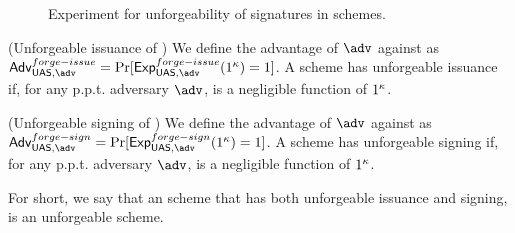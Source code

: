 \begin{figure}[htp!]
  \caption{Experiment for unforgeability of signatures in \UAS schemes.}
  \label{fig:exp-uas-unfor-sign}
\end{figure}


\begin{definition}{(Unforgeable issuance of \UAS)}
  We define the advantage \AdvForgeIssue of $\adv$ against \ExpForgeIssue as
  $\AdvForgeIssue=\Pr\lbrack\ExpForgeIssue(1^\secpar)=1\rbrack$.
  A \UAS scheme has unforgeable issuance if, for any p.p.t. adversary $\adv$,
  \AdvForgeIssue is a negligible function of $1^\kappa$.
\end{definition}

\begin{definition}{(Unforgeable signing of \UAS)}
  We define the advantage \AdvForgeSign of $\adv$ against \ExpForgeSign as
  $\AdvForgeSign=\Pr\lbrack\ExpForgeSign(1^\secpar)=1\rbrack$.
  A \UAS scheme has unforgeable signing if, for any p.p.t. adversary $\adv$,
  \AdvForgeSign is a negligible function of $1^\kappa$.
\end{definition}

For short, we say that an \UAS scheme that has both unforgeable issuance and
signing, is an unforgeable \UAS scheme.

